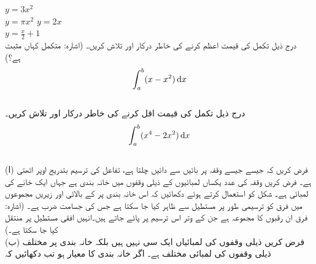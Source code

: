$y=3x^2$\\
$y=\pi x^2$
$y=2x$\\
$y=\tfrac{x}{2}+1$
\\
درج ذیل تکمل کی قیمت اعظم کرنے کی خاطر درکار  اور  تلاش کریں۔ (اشارہ: متکمل کہاں مثبت ہے؟)
\begin{align*}
\int_a^b (x-x^2)\dif x
\end{align*}\\
درج ذیل تکمل کی قیمت اقل کرنے کی خاطر درکار  اور  تلاش کریں۔
\begin{align*}
\int_a^b (x^4-2x^2)\dif x
\end{align*} 
\\
(ا) \quad
فرض کریں کہ جیسے جیسے   وقفہ  پر بائیں سے دائیں چلتا ہے، تفاعل  کی ترسیم بتدریج اوپر اٹھتی ہے۔ فرض کریں وقفہ  کی  عدد یکساں لمبائیوں کے ذیلی وقفوں میں خانہ بندی  ہے جہاں ایک خانے کی لمبائی  ہے۔ شکل  کو استعمال کرتے ہوئے دکھائیں کہ اس خانہ بندی پر  کے بالائی اور زیریں مجموعوں میں فرق کو ترسیمی طور پر مستطیل  سے ظاہر کیا جا سکتا ہے جس کی جسامت  ضرب  ہے۔ (اشارہ: فرق  ان رقبوں کا مجموعہ ہے جن کے وتر   اس  ترسیم پر پائے جاتے ہیں۔انہیں افقی مستطیل  پر منتقل کیا جا سکتا ہے۔)\\
(ب) \quad
فرض کریں ذیلی وقفوں کی لمبائیاں ایک سی نہیں ہیں بلکہ خانہ بندی  پر مختلف ذیلی وقفوں کی لمبائی  مختلف ہے۔ اگر  خانہ بندی  کا معیار ہو تب دکھائیں کہ

